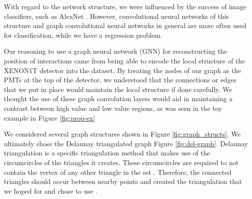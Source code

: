 \documentclass[../thesis.tex]{subfiles}
\begin{document}
\par With regard to the network structure, we were influenced by the success of image classifiers, such as AlexNet \cite{AlexNet}.
However, convolutional neural networks of this structure and graph convolutional neural networks in general are more often used for classification, while we have a regression problem.

\par Our reasoning to use a graph neural network (GNN) for reconstructing the position of interactions came from being able to encode the local structure of the XENON1T detector into the dataset.
By treating the nodes of our graph as the PMTs at the top of the detector, we understood that the connections or edges that we put in place would maintain the local structure if done carefully.
We thought the use of these graph convolution layers would aid in maintaining a contrast between high value and low value regions, as was seen in the toy example in Figure \ref{fig:prop-ex}

\par We considered several graph structures shown in Figure \ref{fig:graph_structs}.
We ultimately chose the Delaunay triangulated graph Figure \ref{fig:del-graph}.
Delaunay triangulation is a specific triangulation method that makes use of the circumcircles of the triangles it creates.
These circumcircles are required to not contain the vertex of any other triangle in the set \cite{Delaunay}.
Therefore, the connected triangles should occur between nearby points and created the triangulation that we hoped for and chose to use \cite{Delaunay}.
\end{document}
